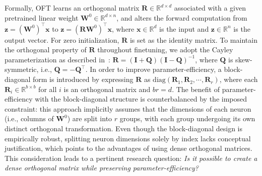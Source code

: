 Formally, OFT learns an orthogonal matrix $\bm{R}\in\mathbb{R}^{d\times d}$ associated with a given pretrained linear weight $\bm{W}^0\in\mathbb{R}^{d\times n}$, and alters the forward computation from $\bm{z}=(\bm{W}^0)^\top\bm{x}$ to $\bm{z}=(\bm{R}\bm{W}^0)^\top\bm{x}$, where $\bm{x}\in\mathbb{R}^{d}$ is the input and $\bm{z}\in\mathbb{R}^{n}$ is the output vector. For zero initialization, $\bm{R}$ is set as the identity matrix. To maintain the orthogonal property of $\bm{R}$ throughout finetuning, we adopt the Cayley parameterization as described in~\cite{qiu2023controlling,liu2021orthogonal}: $\bm{R}=(\bm{I}+\bm{Q})(\bm{I}-\bm{Q})^{-1}$, where $\bm{Q}$ is skew-symmetric, i.e., $\bm{Q}=-\bm{Q}^\top$. In order to improve parameter-efficiency, a block-diagonal form is introduced by expressing $\bm{R}$ as $\text{diag}(\bm{R}_1,\bm{R}_2,\cdots,\bm{R}_r)$, where each $\bm{R}_i\in\mathbb{R}^{b\times b}$ for all $i$ is an orthogonal matrix and $br=d$. The benefit of parameter-efficiency with the block-diagonal structure is counterbalanced by the imposed constraint: this approach implicitly assumes that the dimensions of each neuron (i.e., columns of $\bm{W}^0$) are split into $r$ groups, with each group undergoing its own distinct orthogonal transformation. Even though the block-diagonal design is empirically robust, splitting neuron dimensions solely by index lacks conceptual justification, which points to the advantages of using dense orthogonal matrices. This consideration leads to a pertinent research question: \emph{Is it possible to create a dense orthogonal matrix while preserving parameter-efficiency?}


